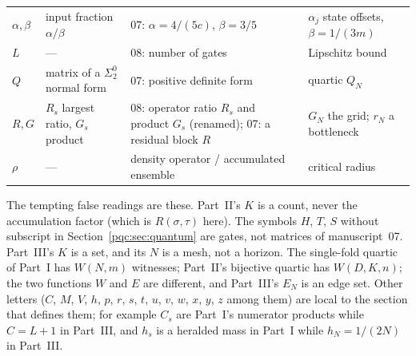 \documentclass[11pt,letterpaper]{article}
\numberwithin{equation}{section}
\theoremstyle{definition}
\theoremstyle{remark}
\newcommand{\sigtwo}{\Sigma^0_2}
\begin{document}
\begin{center}
\begin{tabularx}{\textwidth}{@{}lXXX@{}}
$\alpha,\beta$ & input fraction $\alpha/\beta$ & 07: $\alpha=4/(5c)$, $\beta=3/5$ & $\alpha_j$ state offsets, $\beta=1/(3m)$\\
$L$ & --- & 08: number of gates & Lipschitz bound\\
$Q$ & matrix of a $\sigtwo$ normal form & 07: positive definite form & quartic $Q_N$\\
$R,G$ & $R_s$ largest ratio, $G_s$ product & 08: operator ratio $R_s$ and product $G_s$ (renamed); 07: a residual block $R$ & $G_N$ the grid; $r_N$ a bottleneck\\
$\rho$ & --- & density operator / accumulated ensemble & critical radius\\
\bottomrule
\end{tabularx}
\end{center}

The tempting false readings are these. Part~II's $K$ is a count, never the
accumulation factor (which is $R(\sigma,\tau)$ here). The symbols
$H$, $T$, $S$ without subscript in Section~\ref{pqc:sec:quantum} are gates,
not matrices of manuscript~07. Part~III's $K$ is a set, and its $N$ is a
mesh, not a horizon. The single-fold quartic of Part~I has $W(N,m)$
witnesses; Part~II's bijective quartic has $W(D,K,n)$; the two functions
$W$ and $E$ are different, and Part~III's $E_N$ is an edge set. Other
letters ($C$, $M$, $V$, $h$, $p$, $r$, $s$, $t$, $u$, $v$, $w$, $x$, $y$, $z$
among them) are local to the section that defines them; for example $C_s$
are Part~I's numerator products while $C=L+1$ in Part~III, and $h_s$ is a
heralded mass in Part~I while $h_N=1/(2N)$ in Part~III.
\end{document}
